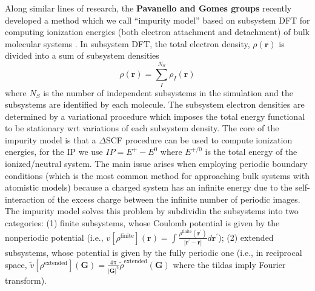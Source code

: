 \documentclass[notitlepage,12pt]{report}
\def\br{{\mathbf{r}}}
\def\bG{{\mathbf{G}}}
\def\brp{{\mathbf{r}^\prime}}
\begin{document}
    Along similar lines of research, the {\bf Pavanello and Gomes groups} recently developed a method which we call ``impurity model'' based on subsystem DFT \supercite{jacob2014subsystem,wesolowski2015frozen,krishtal2015subsystem} for computing ionization energies (both electron attachment and detachment) of bulk molecular systems \supercite{tolle2019charged}. In subsystem DFT,  the total electron density, $\rho(\br)$ is divided into a sum of subsystem densities 
\begin{equation}
    \label{dens}
    \rho(\br) = \sum_I^{N_S}\rho_I(\br)
\end{equation}
    where $N_S$ is the number of independent subsystems in the simulation and the subsystems are identified by each molecule. The subsystem electron densities are determined by a variational procedure which imposes the total energy functional to be stationary wrt variations of each subsystem density. The core of the impurity model is that a $\Delta$SCF procedure\supercite{bagus1965self,waskom2017mwaskom} can be used to compute ionization energies, for the IP we use $IP=E^+-E^0$ where $E^{+/0}$ is the total energy of the ionized/neutral system. The main issue arises when employing periodic boundary conditions (which is the most common method for approaching bulk systems with atomistic models) because a charged system has an infinite energy due to the self-interaction of the excess charge between the infinite number of periodic images. The impurity model solves this problem by subdividin the subsystems into two categories: (1) finite subsystems, whose Coulomb potential is given by the nonperiodic potential (i.e., $v[\rho^{\text{finite}}](\br)=\int\frac{\rho^{\text{finite}}(\brp)}{|\brp-\br|}d\brp$); (2) extended subsystems, whose potential is given by the fully periodic one (i.e., in reciprocal space, $\tilde v[\rho^{\text{extended}}](\bG)=\frac{4\pi}{|\bG|^2}\tilde\rho^\text{extended}(\bG)$ where the tildas imply Fourier transform).
\end{document}
